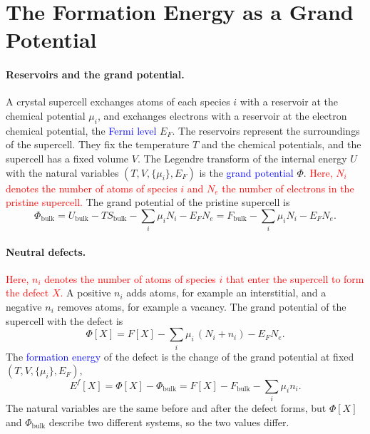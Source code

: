 \section{The Formation Energy as a Grand Potential}

\paragraph{Reservoirs and the grand potential.}
A crystal supercell exchanges atoms of each species $i$ with a reservoir at
the chemical potential $\mu_i$, and exchanges electrons with a reservoir at
the electron chemical potential, the \textcolor{blue}{Fermi level} $E_F$.
The reservoirs represent the surroundings of the supercell. They fix the
temperature $T$ and the chemical potentials, and the supercell has a fixed
volume $V$. The Legendre transform of the internal energy $U$ with the
natural variables $(T,V,\{\mu_i\},E_F)$ is the
\textcolor{blue}{grand potential} $\Phi$.
\textcolor{red}{Here, $N_i$ denotes the number of atoms of species $i$ and
$N_e$ the number of electrons in the pristine supercell.}
The grand potential of the pristine supercell is
\begin{equation*}
    \Phi_{\text{bulk}}=U_{\text{bulk}}-TS_{\text{bulk}}-\sum_i\mu_iN_i-E_FN_e
    =F_{\text{bulk}}-\sum_i\mu_iN_i-E_FN_e.
\end{equation*}

\paragraph{Neutral defects.}
\textcolor{red}{Here, $n_i$ denotes the number of atoms of species $i$ that
enter the supercell to form the defect $X$.} A positive $n_i$ adds atoms,
for example an interstitial, and a negative $n_i$ removes atoms, for example
a vacancy. The grand potential of the supercell with the defect is
\begin{equation*}
    \Phi[X]=F[X]-\sum_i\mu_i\,(N_i+n_i)-E_FN_e.
\end{equation*}
The \textcolor{blue}{formation energy} of the defect is the change of the
grand potential at fixed $(T,V,\{\mu_i\},E_F)$,
\begin{equation}
    \boxed{E^f[X]=\Phi[X]-\Phi_{\text{bulk}}
    =F[X]-F_{\text{bulk}}-\sum_i\mu_in_i.}
\end{equation}
The natural variables are the same before and after the defect forms, but
$\Phi[X]$ and $\Phi_{\text{bulk}}$ describe two different systems, so the
two values differ.

